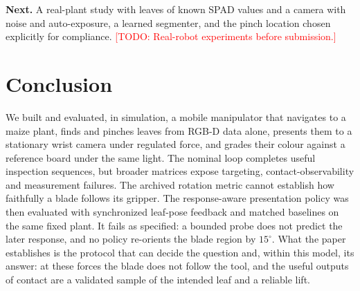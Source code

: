 \documentclass[letterpaper, 10 pt, conference]{ieeeconf}
\newcommand{\todo}[1]{\textcolor{red}{[TODO: #1]}}
\begin{document}
\textbf{Next.} A real-plant study with leaves of known SPAD values and a camera with noise and
auto-exposure, a learned segmenter, and the pinch location chosen explicitly for compliance.
\todo{Real-robot experiments before submission.}

\section{Conclusion}
We built and evaluated, in simulation, a mobile manipulator that navigates to a maize plant,
finds and pinches leaves from RGB-D data alone, presents them to a stationary wrist camera
under regulated force, and grades their colour against a reference board under the same
light. The nominal loop completes useful inspection sequences, but broader matrices expose
targeting, contact-observability and measurement failures. The archived rotation metric
cannot establish how faithfully a blade follows its gripper. The response-aware presentation policy was then evaluated with synchronized leaf-pose
feedback and matched baselines on the same fixed plant. It fails as specified: a bounded
probe does not predict the later response, and no policy re-orients the blade region by
$15^\circ$. What the paper establishes is the protocol that can decide the question and,
within this model, its answer: at these forces the blade does not follow the tool, and the
useful outputs of contact are a validated sample of the intended leaf and a reliable lift.



\end{document}
